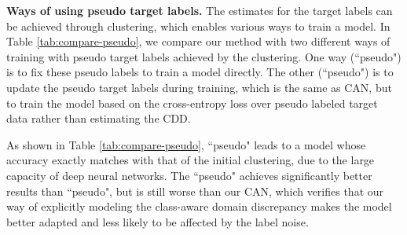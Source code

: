 \documentclass[10pt,twocolumn,letterpaper]{article}
\begin{document}
\setlength{\tabcolsep}{2.5pt}
\begin{table}[ht]
\small
\begin{center}
\end{center}
\caption{\label{tab:compare-pseudo}
Comparison with different ways of utilizing pseudo target labels.The ``pseudo" means training with pseudo target labels (achieved by our initial clustering) directly. The ``pseudo" is to alternatively update target labels through clustering 
and minimize the cross-entropy loss on pseudo labeled target data. In ``pseudo", 
the cross-entropy loss on source data is also minimized.
}
\vspace{-5mm}
\end{table}
\textbf{Ways of using pseudo target labels.}
The estimates for the target labels can be achieved through clustering, 
which enables various ways to train a model.
In Table \ref{tab:compare-pseudo}, we compare our method with two different ways of training
with pseudo target labels achieved by the clustering.
One way (``pseudo") is to fix these pseudo labels to train a model directly.
The other (``pseudo") is to update the pseudo target labels during training,
which is the same as CAN, but to train the model based on the cross-entropy loss
over pseudo labeled target data rather than estimating the CDD.

As shown in Table \ref{tab:compare-pseudo}, ``pseudo" leads to a model 
whose accuracy exactly matches with that of the initial clustering, 
due to the large capacity of deep neural networks.
The ``pseudo" achieves significantly better results than ``pseudo", 
but is still worse than our CAN,
which verifies that our way of explicitly modeling the class-aware domain discrepancy
makes the model better adapted and less likely to be affected by the label noise.
\end{document}

